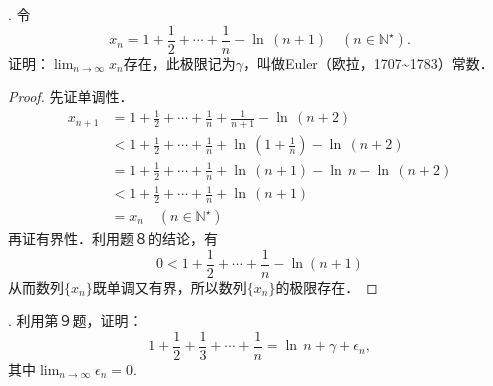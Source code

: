 \documentclass{ctexart}
\theoremstyle{definition}
\theoremstyle{definition}
\theoremstyle{plain}
\theoremstyle{plain}
\theoremstyle{plain}
\theoremstyle{definition}
\begin{document}
. 令
\begin{equation}
    x_n = 1 + \frac{1}{2} + \cdots + \frac{1}{n} - \ln \, \left( n+1 \right) \quad (n \in \mathbb{N}^\star).
\end{equation}
证明：$\displaystyle \lim_{n \to \infty} x_n $存在，此极限记为$\gamma$，叫做Euler（欧拉，1707\textasciitilde 1783）常数．
\begin{proof}
先证单调性．
\begin{align}
    x_{n+1} &= 1 + \frac{1}{2} + \cdots + \frac{1}{n} + \frac{1}{n+1} - \ln \, \left(n+2\right) \\
    &< 1 + \frac{1}{2} + \cdots + \frac{1}{n} + \ln \, \left( 1 + \frac{1}{n} \right) - \ln \, \left( n+2\right) \\
    &= 1 + \frac{1}{2} + \cdots + \frac{1}{n} + \ln \, \left( n+1 \right) - \ln \, n - \ln \, \left( n+2 \right) \\
    &< 1 + \frac{1}{2} + \cdots + \frac{1}{n} + \ln \, \left( n+1 \right) \\
    &= x_n \quad (n \in \mathbb{N}^\star)
\end{align}
再证有界性．利用题８的结论，有
\begin{equation}
    0 < 1 + \frac{1}{2} + \cdots + \frac{1}{n} - \ln \left( n + 1\right) 
\end{equation}
从而数列$\{ x_n \}$既单调又有界，所以数列$\{ x_n \}$的极限存在．
\end{proof}
. 利用第９题，证明：
\begin{equation}
    1+\frac{1}{2} + \frac{1}{3} + \cdots + \frac{1}{n} = \ln \, n + \gamma + \epsilon_n,
\end{equation}
其中$\displaystyle \lim_{n \to \infty} \epsilon_n = 0$.
\end{document}
